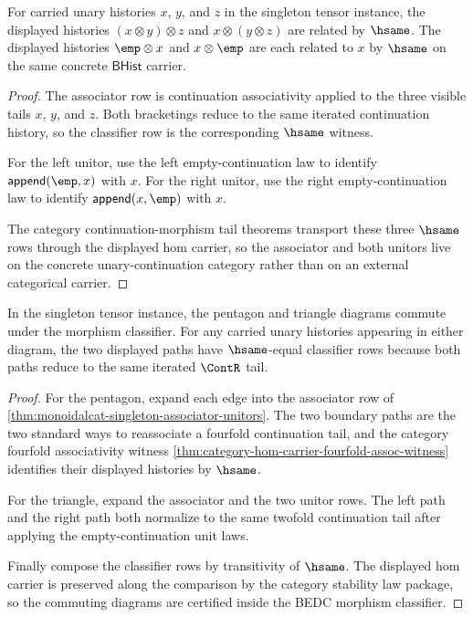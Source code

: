\begin{theorem}
\label{thm:monoidalcat-singleton-associator-unitors}
For carried unary histories $x$, $y$, and $z$ in the singleton tensor instance, the displayed histories $(x\otimes y)\otimes z$ and $x\otimes(y\otimes z)$ are related by $\hsame$. The displayed histories $\emp\otimes x$ and $x\otimes\emp$ are each related to $x$ by $\hsame$ on the same concrete $\mathsf{BHist}$ carrier.
\end{theorem}
\begin{proof}
The associator row is continuation associativity applied to the three visible tails $x$, $y$, and $z$. Both bracketings reduce to the same iterated continuation history, so the classifier row is the corresponding $\hsame$ witness.

For the left unitor, use the left empty-continuation law to identify $\mathsf{append}(\emp,x)$ with $x$. For the right unitor, use the right empty-continuation law to identify $\mathsf{append}(x,\emp)$ with $x$.

The category continuation-morphism tail theorems transport these three $\hsame$ rows through the displayed hom carrier, so the associator and both unitors live on the concrete unary-continuation category rather than on an external categorical carrier.
\end{proof}

\begin{theorem}
\label{thm:monoidalcat-singleton-coherence-laws}
In the singleton tensor instance, the pentagon and triangle diagrams commute under the morphism classifier. For any carried unary histories appearing in either diagram, the two displayed paths have $\hsame$-equal classifier rows because both paths reduce to the same iterated $\ContR$ tail.
\end{theorem}
\begin{proof}
For the pentagon, expand each edge into the associator row of \autoref{thm:monoidalcat-singleton-associator-unitors}. The two boundary paths are the two standard ways to reassociate a fourfold continuation tail, and the category fourfold associativity witness \autoref{thm:category-hom-carrier-fourfold-assoc-witness} identifies their displayed histories by $\hsame$.

For the triangle, expand the associator and the two unitor rows. The left path and the right path both normalize to the same twofold continuation tail after applying the empty-continuation unit laws.

Finally compose the classifier rows by transitivity of $\hsame$. The displayed hom carrier is preserved along the comparison by the category stability law package, so the commuting diagrams are certified inside the BEDC morphism classifier.
\end{proof}

